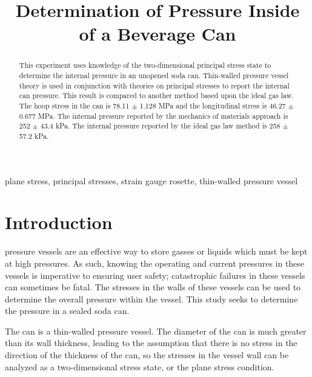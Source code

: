 \documentclass[10pt,journal,letterpaper]{IEEEtran}
\begin{document}
\title{Determination of Pressure Inside of a Beverage Can}

\author{
}

\maketitle
\thispagestyle{empty}

\begin{abstract}
This experiment uses knowledge of the two-dimensional principal stress state to determine the internal pressure in an unopened soda can.
Thin-walled pressure vessel theory is used in conjunction with theories on principal stresses to report the internal can pressure.
This result is compared to another method based upon the ideal gas law.
The hoop stress in the can is 78.11 $\pm$ 1.128 MPa and the longitudinal stress is 46.27 $\pm$ 0.677 MPa.
The internal pressure reported by the mechanics of materials approach is 252 $\pm$ 43.4 kPa.
The internal pressure reported by the ideal gas law method is 258 $\pm$ 57.2 kPa.
\end{abstract}

\begin{IEEEkeywords}
plane stress, principal stresses, strain gauge rosette, thin-walled pressure vessel
\end{IEEEkeywords}

\section{Introduction}
 pressure vessels are an effective way to store gasses or liquids which must be kept at high pressures.
As such, knowing the operating and current pressures in these vessels is imperative to ensuring user safety; catastrophic failures in these vessels can sometimes be fatal.
The stresses in the walls of these vessels can be used to determine the overall pressure within the vessel.
This study seeks to determine the pressure in a sealed soda can.

The can is a thin-walled pressure vessel.
The diameter of the can is much greater than its wall thickness, leading to the assumption that there is no stress in the direction of the thickness of the can, so the stresses in the vessel wall can be analyzed as a two-dimensional stress state, or the plane stress condition.
\end{document}

